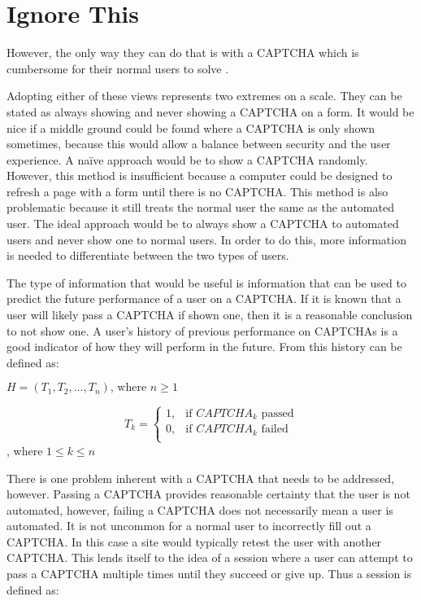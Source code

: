 \documentclass[journal, 12pt, onecolumn, draftclsnofoot]{IEEEtran}
\begin{document}
\section{Ignore This}


However, the only way they can do that is with a CAPTCHA which is cumbersome for their normal users to solve \cite{kluever, yan, benasher}.

Adopting either of these views represents two extremes on a scale. They can be stated as always showing and never showing a CAPTCHA on a form. It would be nice if a middle ground could be found where a CAPTCHA is only shown sometimes, because this would allow a balance between security and the user experience. A naïve approach would be to show a CAPTCHA randomly. However, this method is insufficient because a computer could be designed to refresh a page with a form until there is no CAPTCHA. This method is also problematic because it still treats the normal user the same as the automated user. The ideal approach would be to always show a CAPTCHA to automated users and never show one to normal users. In order to do this, more information is needed to differentiate between the two types of users.

The type of information that would be useful is information that can be used to predict the future performance of a user on a CAPTCHA. If it is known that a user will likely pass a CAPTCHA if shown one, then it is a reasonable conclusion to not show one. A user’s history of previous performance on CAPTCHAs is a good indicator of how they will perform in the future. From this history can be defined as:

$H = (T_1,T_2,\ldots,T_n )\text{, where }n \geq 1$

\[
T_k =
  \begin{cases}
    1, &\text{if $CAPTCHA_k$ passed}\\
    0, &\text{if $CAPTCHA_k$ failed}\\
  \end{cases}
\], where $1 \leq k \leq n$

There is one problem inherent with a CAPTCHA that needs to be addressed, however. Passing a CAPTCHA provides reasonable certainty that the user is not automated, however, failing a CAPTCHA does not necessarily mean a user is automated. It is not uncommon for a normal user to incorrectly fill out a CAPTCHA. In this case a site would typically retest the user with another CAPTCHA. This lends itself to the idea of a session where a user can attempt to pass a CAPTCHA multiple times until they succeed or give up. Thus a session is defined as:
\end{document}
